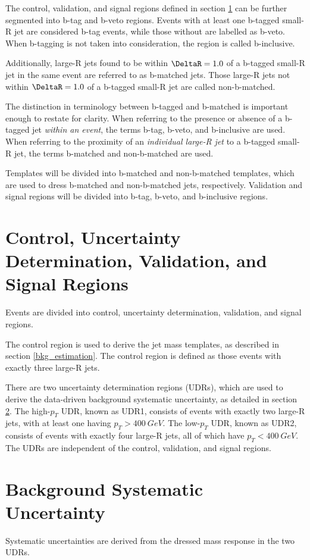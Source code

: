 The control, validation, and signal regions defined in section
\ref{region_defs} can be further segmented into b-tag and b-veto
regions. Events with at least one b-tagged small-R jet are considered
b-tag events, while those without are labelled as b-veto. When
b-tagging is not taken into consideration, the region is called
b-inclusive.

Additionally, large-R jets found to be within $\DeltaR=1.0$ of a
b-tagged small-R jet in the same event are referred to as b-matched
jets. Those large-R jets not within $\DeltaR=1.0$ of a b-tagged
small-R jet are called non-b-matched. 

The distinction in terminology between b-tagged and b-matched is important enough to
restate for clarity. When referring to the presence or absence of a b-tagged
jet \textit{within an event}, the terms b-tag, b-veto, and b-inclusive are used. When
referring to the proximity of an \textit{individual large-R jet} to a b-tagged
small-R jet, the terms b-matched and non-b-matched are used.

Templates will be divided into b-matched and non-b-matched templates,
which are used to dress b-matched and non-b-matched jets,
respectively. Validation and signal regions will be divided into
b-tag, b-veto, and b-inclusive regions.

\section{Control, Uncertainty Determination, Validation, and Signal Regions} \label{region_defs}
Events are divided into control, uncertainty determination,
validation, and signal regions.

The control region is used to derive the jet mass templates, as
described in section \ref{bkg_estimation}. The control region is
defined as those events with exactly three large-R jets. 

There are two uncertainty determination regions (UDRs), which are used to
derive the data-driven background systematic uncertainty, as detailed
in section \ref{bkg_uncert}. The high-$p_{T}$ UDR, known as UDR1,
consists of events with exactly two large-R jets, with at least one
having $p_{T}>400~GeV$. The low-$p_{T}$ UDR, known as UDR2, consists
of events with exactly four large-R jets, all of which have
$p_{T}<400~GeV$. The UDRs are independent of the control, validation,
and signal regions.



\section{Background Systematic Uncertainty} \label{bkg_uncert}
Systematic uncertainties are derived from the dressed mass response in
the two UDRs.

